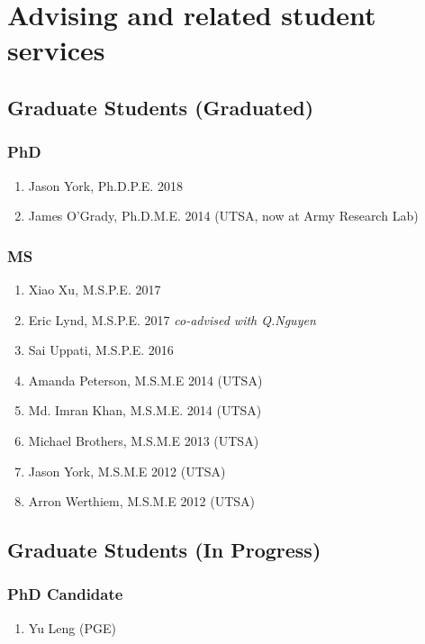 \section*{Advising and related student services}



\subsection*{Graduate Students (Graduated)}

\subsubsection*{PhD}
\begin{enumerate}
    \item Jason York, Ph.D.P.E. 2018 
    \item James O'Grady, Ph.D.M.E. 2014 (UTSA, now at Army Research Lab)
\end{enumerate}

\subsubsection*{MS}
\begin{enumerate}
    \item Xiao Xu, M.S.P.E. 2017
    \item Eric Lynd, M.S.P.E. 2017  \emph{co-advised with Q.Nguyen}
    \item Sai Uppati, M.S.P.E. 2016
    \item Amanda Peterson, M.S.M.E 2014 (UTSA)
    \item Md. Imran Khan, M.S.M.E. 2014 (UTSA)
    \item Michael Brothers, M.S.M.E 2013 (UTSA)
    \item Jason York, M.S.M.E 2012 (UTSA)
    \item Arron Werthiem, M.S.M.E 2012 (UTSA)
\end{enumerate}

\subsection*{Graduate Students (In Progress)}

\subsubsection*{PhD Candidate}
\begin{enumerate}
    \item Yu Leng (PGE)
\end{enumerate}

